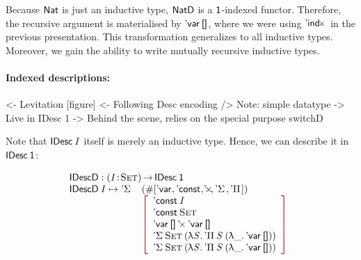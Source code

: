 Because $\Nat$ is just an inductive type, $\NatD$ is a $\Unit$-indexed
functor. Therefore, the recursive argument is materialised by
$\DVar{\Void}$, where we were using $\DIndx{\!}$ in the previous
presentation. This transformation generalizes to all inductive
types. Moreover, we gain the ability to write mutually recursive
inductive types.



\paragraph{Indexed descriptions:}

\begin{wstructure}
<- Levitation [figure]
    <- Following Desc encoding
        /> Note: simple datatype
            -> Live in IDesc 1
    -> Behind the scene, relies on the special purpose switchD
\end{wstructure}

Note that $\IDesc{\V{I}}$ itself is merely an inductive type. Hence,
we can describe it in $\IDesc{\Unit}$:

\[\stk{
\IDescD : \PI{\V{I}}{\Set} \IDesc{\Unit} \\
\begin{array}{@{}ll}
\IDescD\: \V{I} \mapsto \DSigma{\!}{\!} & (\EnumT \red{[} 
                                          \DVar{\!},
                                          \DConst{\!},
                                          \DProd{\!}{\!},
                                          \DSigma{\!}{\!}, 
                                          \DPi{\!}{\!}
                                             \red{]}) \\
                              & \bigRedBracket{\begin{array}{l}
                                      \DConst{\V{I}}                  \\
                                      \DConst{\Set}               \\
                                      \DProd{\DVar{\Void}}{\DVar{\Void}}  \\
                                      \DSigma{\Set}{(\LAM{\V{S}} \DPi{\V{S}}{(\LAM{\_} \DVar{\Void})})} \\
                                      \DSigma{\Set}{(\LAM{\V{S}} \DPi{\V{S}}{(\LAM{\_} \DVar{\Void})})}
                                   \end{array}
                             }
\end{array}
}\]

